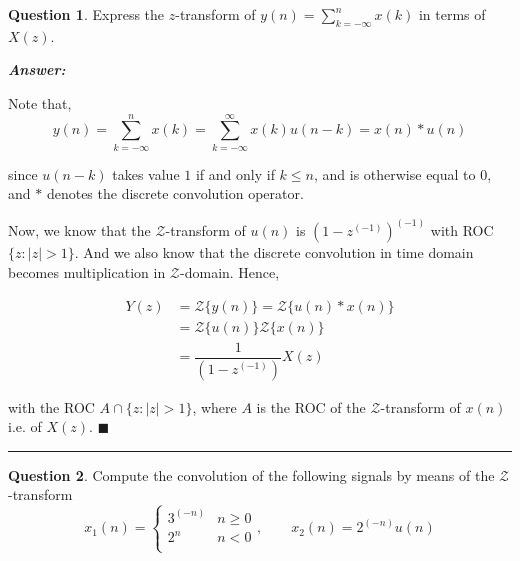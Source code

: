 \documentclass[12pt]{article}
\theoremstyle{definition}
\newtheorem{question}{Question}
\newenvironment{answer}{
    \textbf{\textit{Answer:}} \qquad
}{\hfill $\blacksquare$ \\ 

\begin{center}
    \rule{0.8\linewidth}{1.5px} 
    \vspace*{1cm}   
\end{center}
}
\newcommand{\zcal}{\mathcal{Z}}
\newcommand{\inv}[1][1]{^{(- #1)}}
\begin{document}
\begin{question}
    Express the $z$-transform of $y(n) = \sum_{k = -\infty}^n x(k)$ in terms of $X(z)$.
\end{question}

\begin{answer}
    Note that,
    $$
    y(n) = \sum_{k = -\infty}^n x(k) = \sum_{k = -\infty}^\infty x(k)u(n-k) = x(n) \ast u(n)
    $$

    since $u(n - k)$ takes value $1$ if and only if $k \leq n$, and is otherwise equal to $0$, and $\ast$ denotes the discrete convolution operator.
    
    Now, we know that the $\zcal$-transform of $u(n)$ is $(1 - z\inv)\inv$ with ROC $\{ z : \vert z \vert > 1 \}$. And we also know that the discrete convolution in time domain becomes multiplication in $\zcal$-domain. Hence,

    \begin{align*}
        Y(z) 
        & = \zcal\{ y(n)\} = \zcal\{ u(n) \ast x(n) \}\\
        & = \zcal\{ u(n) \} \zcal\{ x(n) \}\\
        & = \dfrac{1}{(1 - z\inv)} X(z)    
    \end{align*}

    with the ROC $A \cap \{ z : \vert z \vert > 1\}$, where $A$ is the ROC of the $\zcal$-transform of $x(n)$ i.e. of $X(z)$.
\end{answer}


\begin{question}
    Compute the convolution of the following signals by means of the $\zcal$-transform
    $$
    x_1(n) = \begin{cases}
        3^{(-n)} & n \geq 0\\
        2^n & n < 0\\
    \end{cases},\qquad 
    x_2(n) = 2^{(-n)} u(n)
    $$
\end{question}
\end{document}
